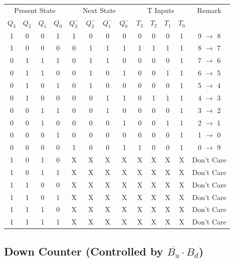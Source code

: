 \documentclass{article}
\begin{document}
    \begin{center}
    \begin{tabular}{cccc|cccc|cccc|c}
    \toprule
    \multicolumn{4}{c|}{Present State} & \multicolumn{4}{c|}{Next State} & \multicolumn{4}{c|}{T Inputs} & Remark \\
    $Q_3$ & $Q_2$ & $Q_1$ & $Q_0$ & $Q_3^-$ & $Q_2^-$ & $Q_1^-$ & $Q_0^-$ & $T_3$ & $T_2$ & $T_1$ & $T_0$ & \\
    \midrule
    1 & 0 & 0 & 1 & 1 & 0 & 0 & 0 & 0 & 0 & 0 & 1 & 9 $\rightarrow$ 8 \\
    1 & 0 & 0 & 0 & 0 & 1 & 1 & 1 & 1 & 1 & 1 & 1 & 8 $\rightarrow$ 7 \\
    0 & 1 & 1 & 1 & 0 & 1 & 1 & 0 & 0 & 0 & 0 & 1 & 7 $\rightarrow$ 6 \\
    0 & 1 & 1 & 0 & 0 & 1 & 0 & 1 & 0 & 0 & 1 & 1 & 6 $\rightarrow$ 5 \\
    0 & 1 & 0 & 1 & 0 & 1 & 0 & 0 & 0 & 0 & 0 & 1 & 5 $\rightarrow$ 4 \\
    0 & 1 & 0 & 0 & 0 & 0 & 1 & 1 & 0 & 1 & 1 & 1 & 4 $\rightarrow$ 3 \\
    0 & 0 & 1 & 1 & 0 & 0 & 1 & 0 & 0 & 0 & 0 & 1 & 3 $\rightarrow$ 2 \\
    0 & 0 & 1 & 0 & 0 & 0 & 0 & 1 & 0 & 0 & 1 & 1 & 2 $\rightarrow$ 1 \\
    0 & 0 & 0 & 1 & 0 & 0 & 0 & 0 & 0 & 0 & 0 & 1 & 1 $\rightarrow$ 0 \\
    0 & 0 & 0 & 0 & 1 & 0 & 0 & 1 & 1 & 0 & 0 & 1 & 0 $\rightarrow$ 9 \\
    \midrule
    1 & 0 & 1 & 0 & X & X & X & X & X & X & X & X & Don't Care \\
    1 & 0 & 1 & 1 & X & X & X & X & X & X & X & X & Don't Care \\
    1 & 1 & 0 & 0 & X & X & X & X & X & X & X & X & Don't Care \\
    1 & 1 & 0 & 1 & X & X & X & X & X & X & X & X & Don't Care \\
    1 & 1 & 1 & 0 & X & X & X & X & X & X & X & X & Don't Care \\
    1 & 1 & 1 & 1 & X & X & X & X & X & X & X & X & Don't Care \\
    \bottomrule
    \end{tabular}
    \end{center}
    
    
    \subsection*{Down Counter (Controlled by $\overline{B_u} \cdot B_d$)}
    
\end{document}
